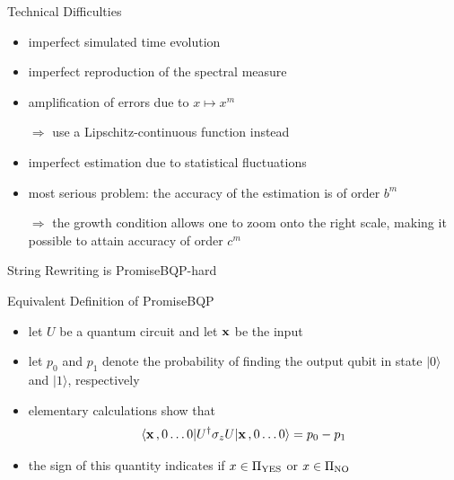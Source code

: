 \documentclass[slideColor]{prosper}
\renewcommand{\>}{\rangle}
\newcommand{\<}{\langle}
\begin{document}

\begin{slide}{Technical Difficulties}

\begin{itemize}
\item imperfect simulated time evolution
\item imperfect reproduction of the spectral measure
\item amplification of errors due to $x\mapsto x^m$ 

$\Longrightarrow$ use a Lipschitz-continuous function instead

\item imperfect estimation due to statistical fluctuations 

\item most serious problem: the accuracy of the estimation is of order $b^m$  

$\Longrightarrow$ the growth condition allows one to zoom onto the right scale, making it possible to attain accuracy of order $c^m$ 
\end{itemize}
\end{slide}


\begin{slide}{String Rewriting is PromiseBQP-hard}
\end{slide}


\begin{slide}{Equivalent Definition of PromiseBQP}

\begin{itemize}
\item let $U$ be a quantum circuit and let ${\bf x}$ be the input
\item let $p_0$ and $p_1$ denote the probability of finding the output qubit in state $|0\>$ and $|1\>$, respectively
\item elementary calculations show that
\[
\<{\bf x}\,, 0\ldots 0|U^\dagger\sigma_z U|{\bf x}\,, 0\ldots 0\>=p_0 - p_1
\]
\item the sign of this quantity indicates if $x\in\Pi_{\rm YES}$ or $x\in\Pi_{\rm NO}$
\end{itemize}

\end{slide}
\end{document}
